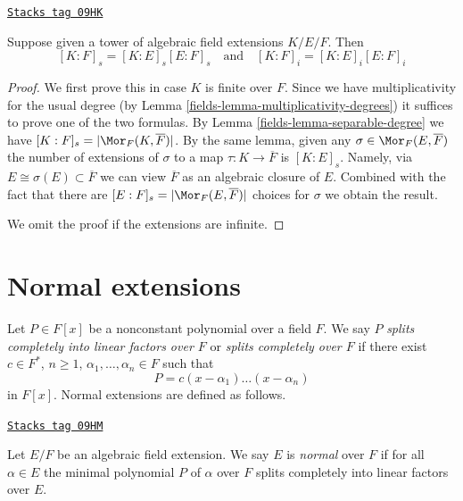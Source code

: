 \begin{lemma}[Multiplicativity]

\label{fields-lemma-multiplicativity-all-degrees}
\href{https://stacks.math.columbia.edu/tag/09HK}{\texttt{Stacks tag 09HK}}

Suppose given a tower of algebraic field extensions $K/E/F$. Then
$$
[K : F]_s = [K : E]_s [E : F]_s
\quad\text{and}\quad
[K : F]_i = [K : E]_i [E : F]_i
$$
\end{lemma}

\begin{proof}

We first prove this in case $K$ is finite over $F$. Since we have
multiplicativity for the usual degree (by
Lemma \ref{fields-lemma-multiplicativity-degrees}) it suffices to prove
one of the two formulas. By Lemma \ref{fields-lemma-separable-degree} we have
$[K : F]_s = |\Mor_F(K, \overline{F})|$. By the same lemma,
given any $\sigma \in \Mor_F(E, \overline{F})$ the number of extensions
of $\sigma$ to a map $\tau : K \to \overline{F}$ is $[K : E]_s$.
Namely, via $E \cong \sigma(E) \subset \overline{F}$ we can view
$\overline{F}$ as an algebraic closure of $E$. Combined with the
fact that there are $[E : F]_s = |\Mor_F(E, \overline{F})|$ choices
for $\sigma$ we obtain the result.

\medskip\noindent
We omit the proof if the extensions are infinite.
\end{proof}

\section{Normal extensions}
\label{fields-section-normal}
Let $P \in F[x]$ be a nonconstant polynomial over a field $F$. We say $P$
{\it splits completely into linear factors over $F$} or
{\it splits completely over $F$} if there exist
$c \in F^*$, $n \geq 1$, $\alpha_1, \ldots, \alpha_n \in F$ such that
$$
P = c(x - \alpha_1) \ldots (x - \alpha_n)
$$
in $F[x]$. Normal extensions are defined as follows.

\begin{definition}[Normal]
\label{fields-definition-normal}
\href{https://stacks.math.columbia.edu/tag/09HM}{\texttt{Stacks tag 09HM}}

Let $E/F$ be an algebraic field extension. We say $E$ is {\it normal}
over $F$ if for all $\alpha \in E$ the minimal polynomial $P$
of $\alpha$ over $F$ splits completely into linear factors over $E$.
\end{definition}

